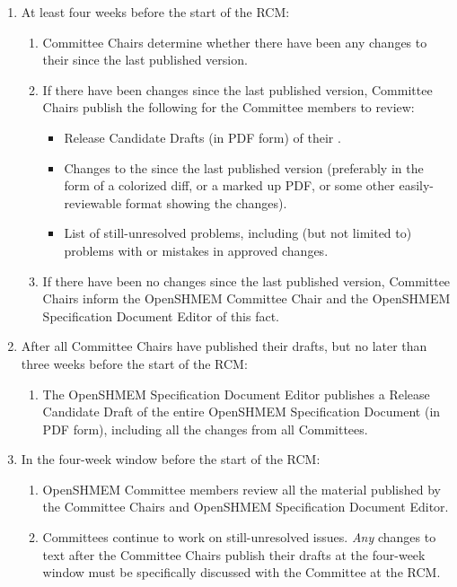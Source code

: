 \begin{enumerate}
\item At least four weeks before the start of the RCM:
  \begin{enumerate}
  \item {} Committee Chairs determine whether there have been
    any changes to their  since the last published version.
  \item If there have been changes since the last published version,
     Committee Chairs publish the following for the Committee
    members to review:
    \begin{itemize}
      \item Release Candidate Drafts (in PDF form) of their .
      \item Changes to the  since the last published version
        (preferably in the form of a colorized diff, or a marked up
        PDF, or some other easily-reviewable format showing the
        changes).
      \item List of still-unresolved problems, including (but not
        limited to) problems with or mistakes in approved changes.
    \end{itemize}
  \item If there have been no changes since the last
    published version,  Committee Chairs inform the OpenSHMEM Committee
    Chair and the OpenSHMEM Specification Document Editor of this fact.
  \end{enumerate}

\item After all  Committee Chairs have published their 
  drafts, but no later than three weeks before the start of the RCM:
  \begin{enumerate}
  \item The OpenSHMEM Specification Document Editor publishes a Release Candidate
    Draft of the entire OpenSHMEM Specification Document (in PDF form), including
    all the changes from all  Committees.
  \end{enumerate}

\item In the four-week window before the start of the RCM:
  \begin{enumerate}
  \item OpenSHMEM Committee members review all the material published by the
     Committee Chairs and OpenSHMEM Specification Document Editor.
  \item {} Committees continue to work on still-unresolved
    issues.  {\em Any} changes to text after the 
      Committee Chairs publish their  drafts at the four-week
    window must be specifically discussed with the Committee at the RCM.
  \end{enumerate}


\end{enumerate}
